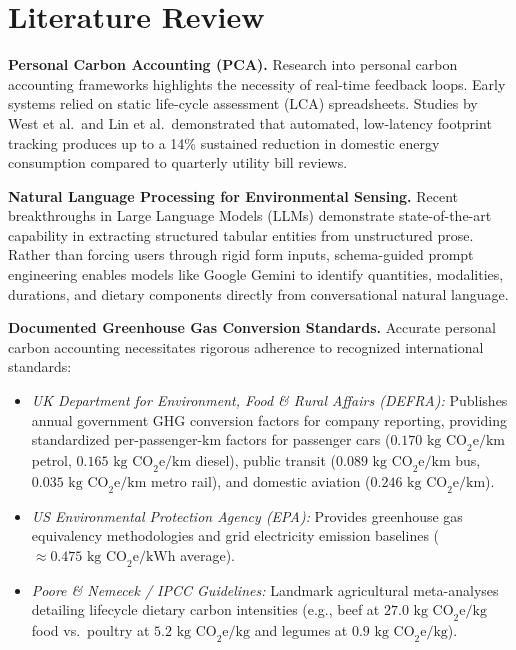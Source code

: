 \documentclass[12pt,a4paper]{article}
\begin{document}
\section{Literature Review}
\textbf{Personal Carbon Accounting (PCA).} Research into personal carbon accounting frameworks highlights the necessity of real-time feedback loops. Early systems relied on static life-cycle assessment (LCA) spreadsheets. Studies by West et al.\ and Lin et al.\ demonstrated that automated, low-latency footprint tracking produces up to a 14\% sustained reduction in domestic energy consumption compared to quarterly utility bill reviews.

\textbf{Natural Language Processing for Environmental Sensing.} Recent breakthroughs in Large Language Models (LLMs) demonstrate state-of-the-art capability in extracting structured tabular entities from unstructured prose. Rather than forcing users through rigid form inputs, schema-guided prompt engineering enables models like Google Gemini to identify quantities, modalities, durations, and dietary components directly from conversational natural language.

\textbf{Documented Greenhouse Gas Conversion Standards.} Accurate personal carbon accounting necessitates rigorous adherence to recognized international standards:
\begin{itemize}
    \item \emph{UK Department for Environment, Food \& Rural Affairs (DEFRA):} Publishes annual government GHG conversion factors for company reporting, providing standardized per-passenger-km factors for passenger cars ($0.170\text{ kg CO}_2\text{e/km}$ petrol, $0.165\text{ kg CO}_2\text{e/km}$ diesel), public transit ($0.089\text{ kg CO}_2\text{e/km}$ bus, $0.035\text{ kg CO}_2\text{e/km}$ metro rail), and domestic aviation ($0.246\text{ kg CO}_2\text{e/km}$).
    \item \emph{US Environmental Protection Agency (EPA):} Provides greenhouse gas equivalency methodologies and grid electricity emission baselines ($\approx 0.475\text{ kg CO}_2\text{e/kWh}$ average).
    \item \emph{Poore \& Nemecek / IPCC Guidelines:} Landmark agricultural meta-analyses detailing lifecycle dietary carbon intensities (e.g., beef at $27.0\text{ kg CO}_2\text{e/kg}$ food vs.\ poultry at $5.2\text{ kg CO}_2\text{e/kg}$ and legumes at $0.9\text{ kg CO}_2\text{e/kg}$).
\end{itemize}
\end{document}
